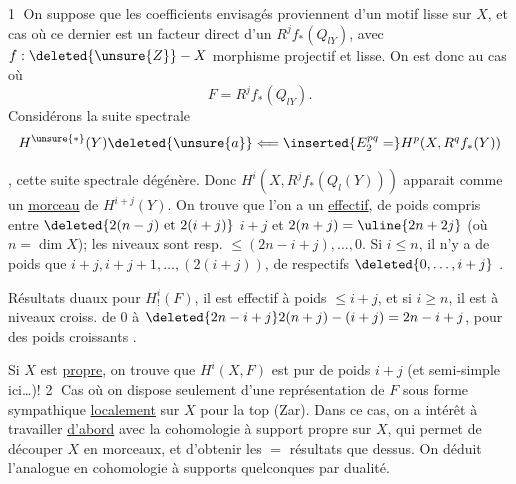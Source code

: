 \textcircled{1} On suppose que les coefficients envisagés proviennent d'un motif lisse sur $X$, et   cas où ce dernier est un facteur direct d'un $R^jf_*(Q_{l Y})$, avec $f:\deleted{\unsure{Z}}\mathbin{-}X$ morphisme projectif et lisse.  On est donc  au cas où
\[
F=R^jf_*(Q_{l Y}).
\]
Considérons la suite spectrale
\[
H^{\unsure{*}}(Y)\deleted{\unsure{a}}\Longleftarrow
\inserted{E^{pq}_2=}
H^p(X,R^qf_*(Y))
\]

, cette suite spectrale dégénère. Donc $H^i(X,R^jf_*(Q_l(Y)))$  apparait comme un \uline{morceau} de $H^{i+j}(Y)$. On trouve que l'on a un  \uline{effectif}, de poids \deleted{\unsure{\ne}} compris entre
$\deleted{2(n-j)\text{ et }2(i+j)}$
\uline{$i+j$} et $2(n+j)=\uline{2n+2j}$ (où $n=\dim X$);
les niveaux sont resp. $\le(2n-i+j),\ldots,0$.
Si $i\le n$, il n'y a de poids que  $i+j,i+j+1,\ldots,(2(i+j))$, de   respectifs
$\deleted{0,\ldots,i+j}$ .


Résultats duaux pour $H^i_!(F)$, il est effectif à poids $\le i+j$, et  si $i\ge n$, il est à niveaux croiss. de $0$ à $\deleted{2n-i+j}2(n+j)-(i+j)=2n-i+j$, pour des poids croissants .


Si $X$ est \uline{propre}, on trouve que $H^i(X,F)$ est pur de poids $i+j$ (et semi-simple ici\ldots)!
\textcircled{2} Cas où on dispose seulement d'une représentation de $F$ sous forme sympathique \uline{localement} sur $X$ pour la top (Zar). Dans ce cas,
on a intérêt à travailler \uline{d'abord} avec la cohomologie à support propre sur $X$, qui permet de découper $X$ en morceaux, et d'obtenir les $=$ résultats que dessus. On déduit l'analogue en cohomologie à supports quelconques par dualité.

